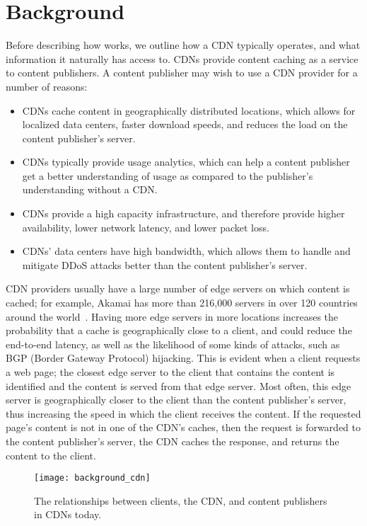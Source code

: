 \section{Background}
\label{sec:background}
Before describing how \system{} works, we outline how a CDN typically operates, and what information 
it naturally has access to.  CDNs provide content caching as a service to content publishers.  A 
content publisher may wish to use a CDN provider for a number of reasons:

\begin{itemize}
\item CDNs cache content in geographically distributed locations, which allows for localized 
data centers, faster download speeds, and reduces the load on the content publisher's server.
\item CDNs typically provide usage analytics, which can help a content publisher get a better 
understanding of usage as compared to the publisher's understanding without a CDN.
\item CDNs provide a high capacity infrastructure, and therefore provide higher availability, 
lower network latency, and lower packet loss.  
\item CDNs' data centers have high bandwidth, which allows them to handle and mitigate DDoS attacks better 
than the content publisher's server.
\end{itemize}

CDN providers usually have a large number of edge servers on which content is cached; for example, 
Akamai has more than 216,000 servers in over 120 countries around the world~\cite{akamai_facts}.  
Having more edge servers in more locations increases the probability that a cache is geographically 
close to a client, and could reduce the end-to-end latency, as well as the likelihood of some kinds of 
attacks, such as BGP (Border Gateway Protocol) hijacking.  This is evident when a client requests a web page; the closest 
edge server to the client that contains the content is identified and the content is served from that 
edge server.  Most often, this edge server is geographically closer to the client than the content publisher's 
server, thus increasing the speed in which the client receives the content. If the requested page's content is 
not in one of the CDN's caches, then the request is forwarded to the content publisher's server, the CDN 
caches the response, and returns the content to the client. 

\begin{figure}[h]
\centering
\texttt{[image: background\_cdn]}
\caption{The relationships between clients, the CDN, and content publishers in 
CDNs today.}
\label{fig:basic_cdn}
\end{figure}

